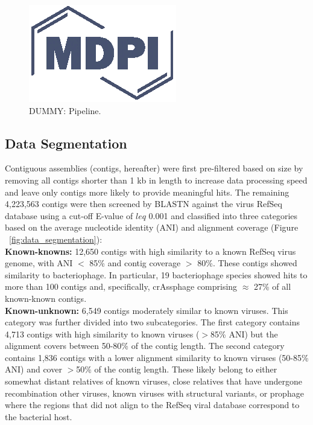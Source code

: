   \begin{figure}[h]
    \centering
    \includegraphics{Definitions/logo-mdpi}
    \caption{DUMMY: Pipeline.
            \label{fig:data_selection_pipeline}}
  \end{figure}

  \subsection{Data Segmentation}
  Contiguous assemblies (contigs, hereafter) were first pre-filtered based on
  size by removing all contigs shorter than 1 kb in length to increase data
  processing speed and leave only contigs more likely to provide meaningful
  hits. The remaining 4,223,563 contigs were then screened by BLASTN
  \cite{Camacho2009} against the virus RefSeq database \cite{Brister2015} using
  a cut-off E-value of $leq$ 0.001 and classified into three categories based
  on the average nucleotide identity (ANI) and alignment coverage (Figure
  ~\ref{fig:data_segmentation}):\\

    \textbf{Known-knowns:} 12,650 contigs with high similarity to a known RefSeq
    virus genome, with ANI $<$ 85\% and contig coverage $>$ 80\%. These contigs
    showed similarity to bacteriophage. In particular, 19 bacteriophage species
    showed hits to more than 100 contigs and, specifically, crAssphage
    comprising $\approx$ 27\% of all known-known contigs.\\

    \textbf{Known-unknown:} 6,549 contigs moderately similar to known viruses.
    This category was further divided into two subcategories. The first
    category contains 4,713 contigs with high similarity to known viruses
    ($>$85\% ANI) but the alignment covers between 50-80\% of the contig
    length. The second category contains  1,836 contigs with a  lower alignment
    similarity to known viruses (50-85\% ANI) and cover $>$50\% of the contig
    length. These likely belong to either somewhat distant relatives of known
    viruses, close relatives that have undergone recombination other viruses,
    known viruses with structural variants, or prophage where the regions that
    did not align to the RefSeq viral database correspond to the bacterial
    host.\\

